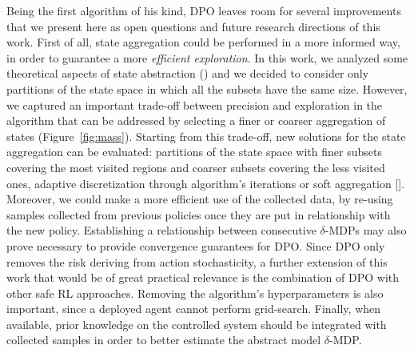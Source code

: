 \newline
Being the first algorithm of his kind, \ac{DPO} leaves room for several improvements that we present here as open questions and future research directions of this work.
First of all, state aggregation could be performed in a more informed way, in order to guarantee a more \textit{efficient exploration}. In this work, we analyzed some theoretical aspects of state abstraction () and we decided to consider only partitions of the state space in which all the subsets have the same size. However, we captured an important trade-off between precision and exploration in the algorithm that can be addressed by selecting a finer or coarser aggregation of states (Figure~\ref{fig:mass}). Starting from this trade-off, new solutions for the state aggregation can be evaluated: partitions of the state space with finer subsets covering the most visited regions and coarser subsets covering the less visited ones, adaptive discretization through algorithm's iterations or soft aggregation [\cite{NIPS1994_981}]. Moreover, we could make a more efficient use of the collected data, by re-using samples collected from previous policies once they are put in relationship with the new policy. Establishing a relationship between consecutive $\delta$-\ac{MDPs} may also prove necessary to provide convergence guarantees for \ac{DPO}. Since \ac{DPO} only removes the risk deriving from action stochasticity, a further extension of this work that would be of great practical relevance is the combination of \ac{DPO} with other safe \ac{RL} approaches. Removing the algorithm's hyperparameters is also important, since a deployed agent cannot perform grid-search. Finally, when available, prior knowledge on the controlled system should be integrated with collected samples in order to better estimate the abstract model $\delta$-\ac{MDP}.